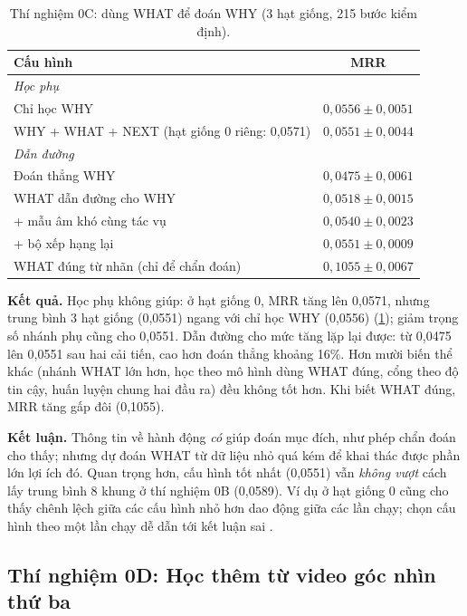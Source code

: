 \documentclass[a4paper,oneside]{report}
\begin{document}
\begin{table}[ht]
\centering
\caption{Thí nghiệm 0C: dùng WHAT để đoán WHY (3 hạt giống, 215 bước kiểm định).}
\label{tab:stage0c}
\small
\begin{tabular}{lc}
\toprule
Cấu hình & MRR \\
\midrule
\multicolumn{2}{l}{\textit{Học phụ}} \\
Chỉ học WHY & $0{,}0556 \pm 0{,}0051$ \\
WHY + WHAT + NEXT (hạt giống 0 riêng: 0,0571) & $0{,}0551 \pm 0{,}0044$ \\
\midrule
\multicolumn{2}{l}{\textit{Dẫn đường}} \\
Đoán thẳng WHY & $0{,}0475 \pm 0{,}0061$ \\
WHAT dẫn đường cho WHY & $0{,}0518 \pm 0{,}0015$ \\
\quad + mẫu âm khó cùng tác vụ & $0{,}0540 \pm 0{,}0023$ \\
\quad + bộ xếp hạng lại & $0{,}0551 \pm 0{,}0009$ \\
\midrule
WHAT đúng từ nhãn (chỉ để chẩn đoán) & $0{,}1055 \pm 0{,}0067$ \\
\bottomrule
\end{tabular}
\end{table}

\textbf{Kết quả.} Học phụ không giúp: ở hạt giống 0, MRR tăng lên 0,0571, nhưng trung bình 3 hạt giống (0,0551) ngang với chỉ học WHY (0,0556) (\cref{tab:stage0c}); giảm trọng số nhánh phụ cũng cho 0,0551. Dẫn đường cho mức tăng lặp lại được: từ 0,0475 lên 0,0551 sau hai cải tiến, cao hơn đoán thẳng khoảng 16\%. Hơn mười biến thể khác (nhánh WHAT lớn hơn, học theo mô hình dùng WHAT đúng, cổng theo độ tin cậy, huấn luyện chung hai đầu ra) đều không tốt hơn. Khi biết WHAT đúng, MRR tăng gấp đôi (0,1055).

\textbf{Kết luận.} Thông tin về hành động \textit{có} giúp đoán mục đích, như phép chẩn đoán cho thấy; nhưng dự đoán WHAT từ dữ liệu nhỏ quá kém để khai thác được phần lớn lợi ích đó. Quan trọng hơn, cấu hình tốt nhất (0,0551) vẫn \textit{không vượt} cách lấy trung bình 8 khung ở thí nghiệm 0B (0,0589). Ví dụ ở hạt giống 0 cũng cho thấy chênh lệch giữa các cấu hình nhỏ hơn dao động giữa các lần chạy; chọn cấu hình theo một lần chạy dễ dẫn tới kết luận sai \citep{bouthillier2021variance}.

\subsection{Thí nghiệm 0D: Học thêm từ video góc nhìn thứ ba}
\end{document}
